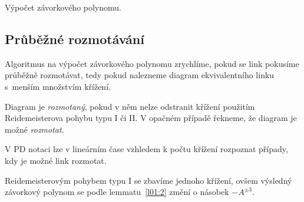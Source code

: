 \begin{algorithm}[p]

\caption{Výpočet závorkového polynomu.}
\label{alg02:02}

\DontPrintSemicolon

%




\end{algorithm}

\subsection{Průběžné rozmotávání} \label{rozmot}
Algoritmus na výpočet závorkového polynomu zrychlíme, pokud se link pokusíme průběžně rozmotávat, tedy pokud nalezneme diagram ekvivalentního linku s~menším množstvím křížení.

\begin{definice} \label{rozmot}
Diagram je \emph{rozmotaný}, pokud v něm nelze odstranit křížení použitím Reidemeisterova pohybu typu I či II. V opačném případě řekneme, že diagram je možné \emph{rozmotat}.
\end{definice}

V PD notaci lze v lineárním čase vzhledem k počtu křížení rozpoznat případy, kdy je možné link rozmotat.

Reidemeisterovým pohybem typu I se zbavíme jednoho křížení, ovšem výsledný závorkový polynom se podle lemmatu~\ref{l01:2} změní o násobek $-A^{\pm3}$.

